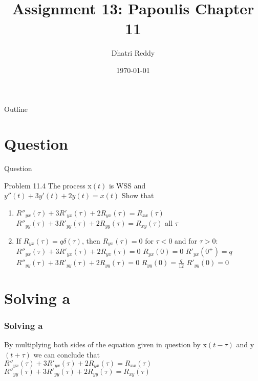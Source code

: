 \documentclass{beamer}
\title{Assignment 13: Papoulis Chapter 11 }
\author{Dhatri Reddy}
\date{\today}
\providecommand{\brak}[1]{\ensuremath{\left(#1\right)}}
\begin{document}
\begin{frame}
    \titlepage 
\end{frame}

\logo{}

\begin{frame}{Outline}
    \tableofcontents
\end{frame}

\section{Question}
\begin{frame}{Question}
    \begin{block}{Problem 11.4}
    The process x\brak{t} is WSS and 
    $y''\brak{t} + 3y'\brak{t} + 2y\brak{t} = x\brak{t}$
    Show that
    \begin{enumerate}[label=(\alph*)]
    \item $R''_{yx}\brak{\tau} + 3R'_{yx}\brak{\tau} + 2R_{yx}\brak{\tau} = R_{xx}\brak{\tau} $\\
    $R''_{yy}\brak{\tau} + 3R'_{yy}\brak{\tau} + 2R_{yy}\brak{\tau} = R_{xy}\brak{\tau} $ all $\tau$
    \item If $R_{yx}\brak{\tau} = q\delta\brak{\tau}$, then $R_{yx}\brak{\tau} = 0$ for $\tau < 0$ and for $\tau > 0$:\\
    $R''_{yx}\brak{\tau} + 3R'_{yx}\brak{\tau} + 2R_{yx}\brak{\tau} = 0 $  $R_{yx}\brak{0} = 0$  $R'_{yx}\brak{0^{+}} = q$ \\
    $R''_{yy}\brak{\tau} + 3R'_{yy}\brak{\tau} + 2R_{yy}\brak{\tau} = 0 $  $R_{yy}\brak{0} = \frac{q}{12}$ $R'_{yy}\brak{0} = 0$
    \end{enumerate}
\end{block}
\end{frame}

\section{Solving a}
\begin{frame}
\frametitle{Solving a}
By multiplying both sides of the equation given in question by x\brak{t-\tau} and y\brak{t+\tau} we can conclude that\\
$R''_{yx}\brak{\tau} + 3R'_{yx}\brak{\tau} + 2R_{yx}\brak{\tau} = R_{xx}\brak{\tau} $\\
$R''_{yy}\brak{\tau} + 3R'_{yy}\brak{\tau} + 2R_{yy}\brak{\tau} = R_{xy}\brak{\tau} $

\end{frame}
\end{document}
